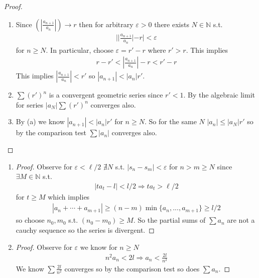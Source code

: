 \begin{proof}
    \begin{enumerate}[label=(\alph*)]
        \item 
        Since $(|\frac{a_{n+1}}{a_n}|) \rightarrow r$ then for arbitrary 
        $\varepsilon>0$ there exists $N\in \mathbb{N}$ s.t. 
        \begin{align*}
            ||\frac{a_{n+1}}{a_n}| - r| < \varepsilon
        \end{align*} 
        for $n\geq N$. In particular, choose $\varepsilon = r'-r$ where 
        $r'>r$. This implies 
        \begin{align*}
            r-r' < |\frac{a_{n+1}}{a_n}| - r < r'-r
        \end{align*}
        This implies $|\frac{a_{n+1}}{a_n}| < r'$ so $ |a_{n+1}| <|a_n| r' $.
    
        \item
        $\sum (r')^n$ is a convergent geometric series since $r'<1$.
        By the algebraic limit \Thm for series $|a_N|\sum (r')^n$ converges
        also.
    
        \item
        By (a) we know $|a_{n+1}| <|a_n| r'$ for $n \geq N$. So for the same $N$
        $|a_n| \leq |a_N|r'$ so by the comparison test $\sum |a_n|$ converges also.
    \end{enumerate}
\end{proof}

\begin{enumerate}[label=(\alph*)]
    \item 
    \begin{proof}
        Observe for $\varepsilon < \ell/2$ $\nexists N$ s.t. $|s_n-s_m| < \varepsilon$
        for $n>m\geq N$ since $\exists M \in \mathbb{N}$ s.t. 
        \begin{align*}
            |ta_t -l| <l/2 \Rightarrow ta_t > \ell/2
        \end{align*}
        for $t\geq M$ which implies 
        \begin{align*}
            |a_n + \cdots + a_{m+1}| \geq (n-m) \min\{a_n, ..., a_{m+1}\} \geq l/2
        \end{align*}
        so choose $n_0, m_0$ s.t. $(n_0-m_0) \geq M$.
        So the partial sums of $\sum a_n$ are not a cauchy sequence so the
        series is divergent.
    \end{proof}

    \item 
    \begin{proof}
        Observe for $\varepsilon$ we know for $n \geq N$
        \begin{align*}
            n^2 a_n < 2l \Rightarrow a_n < \frac{2l}{n^2}
        \end{align*}
        We know $\sum \frac{2l}{n^2}$ converges so by the comparison test
        so does $\sum a_n$.
    \end{proof}
\end{enumerate}

